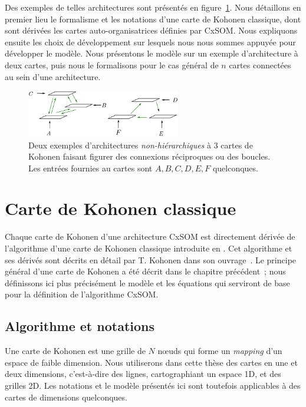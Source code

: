 \documentclass[../main]{subfiles}
\begin{document}
Des exemples de telles architectures sont présentés en figure~\ref{fig:archi_non_hierarchique}.
Nous détaillons en premier lieu le formalisme et les notations d'une carte de Kohonen classique, dont sont dérivées les cartes auto-organisatrices définies par CxSOM. 
Nous expliquons ensuite les choix de développement sur lesquels nous nous sommes appuyée pour développer le modèle. Nous présentons le modèle sur un exemple d'architecture à deux cartes, puis nous le formalisons pour le cas général de $n$ cartes connectées au sein d'une architecture.

\begin{figure}
\centering
\includegraphics[width=0.6\textwidth]{architecture.pdf}
\caption{Deux exemples d'architectures \emph{non-hiérarchiques} à 3 cartes de Kohonen faisant figurer des connexions réciproques ou des boucles.
Les entrées fournies au cartes sont $A,B,C,D,E,F$ quelconques.}
\label{fig:archi_non_hierarchique}
\end{figure}


\section{Carte de Kohonen classique}\label{sec:kohonen}

Chaque carte de Kohonen d'une architecture CxSOM est directement dérivée de l'algorithme d'une carte de Kohonen classique introduite en \cite{Kohonen1982}. Cet algorithme et ses dérivés sont décrits en détail par T. Kohonen dans son ouvrage~\parencite{Kohonen1995SelfOrganizingM}. Le principe général d'une carte de Kohonen a été décrit dans le chapitre précédent~; nous définissons ici plus précisément le modèle et les équations qui serviront de base pour la définition de l'algorithme CxSOM.

\subsection{Algorithme et notations}

Une carte de Kohonen est une grille de $N$ n\oe{}uds qui forme un \emph{mapping} d'un espace de faible dimension. 
Nous utiliserons dans cette thèse des cartes en une et deux dimensions, c'est-à-dire des lignes, cartographiant un espace 1D, et des grilles 2D. Les notations et le modèle présentés ici sont toutefois applicables à des cartes de dimensions quelconques.
\end{document}
